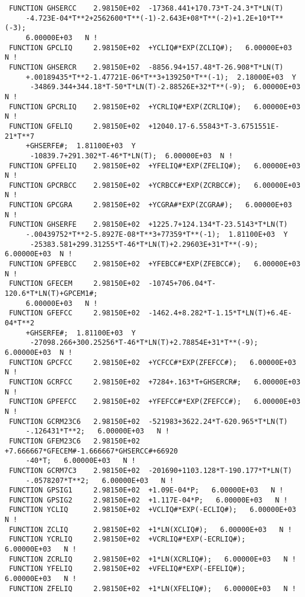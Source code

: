 \documentclass[12pt]{article}
\begin{document}
\begin{verbatim}
 FUNCTION GHSERCC    2.98150E+02  -17368.441+170.73*T-24.3*T*LN(T)
     -4.723E-04*T**2+2562600*T**(-1)-2.643E+08*T**(-2)+1.2E+10*T**(-3);   
     6.00000E+03   N !
 FUNCTION GPCLIQ     2.98150E+02  +YCLIQ#*EXP(ZCLIQ#);   6.00000E+03   N !
 FUNCTION GHSERCR    2.98150E+02  -8856.94+157.48*T-26.908*T*LN(T)
     +.00189435*T**2-1.47721E-06*T**3+139250*T**(-1);  2.18000E+03  Y
      -34869.344+344.18*T-50*T*LN(T)-2.88526E+32*T**(-9);  6.00000E+03  N !
 FUNCTION GPCRLIQ    2.98150E+02  +YCRLIQ#*EXP(ZCRLIQ#);   6.00000E+03   N !
 FUNCTION GFELIQ     2.98150E+02  +12040.17-6.55843*T-3.6751551E-21*T**7
     +GHSERFE#;  1.81100E+03  Y
      -10839.7+291.302*T-46*T*LN(T);  6.00000E+03  N !
 FUNCTION GPFELIQ    2.98150E+02  +YFELIQ#*EXP(ZFELIQ#);   6.00000E+03   N !
 FUNCTION GPCRBCC    2.98150E+02  +YCRBCC#*EXP(ZCRBCC#);   6.00000E+03   N !
 FUNCTION GPCGRA     2.98150E+02  +YCGRA#*EXP(ZCGRA#);   6.00000E+03   N !
 FUNCTION GHSERFE    2.98150E+02  +1225.7+124.134*T-23.5143*T*LN(T)
     -.00439752*T**2-5.8927E-08*T**3+77359*T**(-1);  1.81100E+03  Y
      -25383.581+299.31255*T-46*T*LN(T)+2.29603E+31*T**(-9);  6.00000E+03  N !
 FUNCTION GPFEBCC    2.98150E+02  +YFEBCC#*EXP(ZFEBCC#);   6.00000E+03   N !
 FUNCTION GFECEM     2.98150E+02  -10745+706.04*T-120.6*T*LN(T)+GPCEM1#;   
     6.00000E+03   N !
 FUNCTION GFEFCC     2.98150E+02  -1462.4+8.282*T-1.15*T*LN(T)+6.4E-04*T**2
     +GHSERFE#;  1.81100E+03  Y
      -27098.266+300.25256*T-46*T*LN(T)+2.78854E+31*T**(-9);  6.00000E+03  N !
 FUNCTION GPCFCC     2.98150E+02  +YCFCC#*EXP(ZFEFCC#);   6.00000E+03   N !
 FUNCTION GCRFCC     2.98150E+02  +7284+.163*T+GHSERCR#;   6.00000E+03   N !
 FUNCTION GPFEFCC    2.98150E+02  +YFEFCC#*EXP(ZFEFCC#);   6.00000E+03   N !
 FUNCTION GCRM23C6   2.98150E+02  -521983+3622.24*T-620.965*T*LN(T)
     -.126431*T**2;   6.00000E+03   N !
 FUNCTION GFEM23C6   2.98150E+02  +7.666667*GFECEM#-1.666667*GHSERCC#+66920
     -40*T;   6.00000E+03   N !
 FUNCTION GCRM7C3    2.98150E+02  -201690+1103.128*T-190.177*T*LN(T)
     -.0578207*T**2;   6.00000E+03   N !
 FUNCTION GPSIG1     2.98150E+02  +1.09E-04*P;   6.00000E+03   N !
 FUNCTION GPSIG2     2.98150E+02  +1.117E-04*P;   6.00000E+03   N !
 FUNCTION YCLIQ      2.98150E+02  +VCLIQ#*EXP(-ECLIQ#);   6.00000E+03   N !
 FUNCTION ZCLIQ      2.98150E+02  +1*LN(XCLIQ#);   6.00000E+03   N !
 FUNCTION YCRLIQ     2.98150E+02  +VCRLIQ#*EXP(-ECRLIQ#);   6.00000E+03   N !
 FUNCTION ZCRLIQ     2.98150E+02  +1*LN(XCRLIQ#);   6.00000E+03   N !
 FUNCTION YFELIQ     2.98150E+02  +VFELIQ#*EXP(-EFELIQ#);   6.00000E+03   N !
 FUNCTION ZFELIQ     2.98150E+02  +1*LN(XFELIQ#);   6.00000E+03   N !

\end{verbatim}
\end{document}

